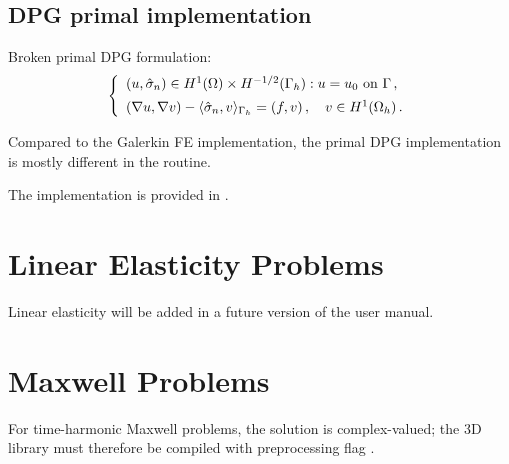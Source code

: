 \subsection{DPG primal implementation}
\label{subsec:poisson-ultraweak}

Broken primal DPG formulation:
\[
\left\{
\begin{array}{llll}
	(u, \hat \sigma_n) \in H^1(\Omega) \times H^{-1/2}(\Gamma_h): u = u_0 \text{ on } \Gamma \, , \\[5pt]
	(\nabla u, \nabla v) - \langle \hat \sigma_n , v \rangle_{\Gamma_h} 
	= (f,v) \, ,\quad v \in H^1(\Omega_h) \, .
\end{array}
\right.
\]

Compared to the Galerkin FE implementation, the primal DPG implementation is mostly different in the  routine.

The implementation is provided in .

\section{Linear Elasticity Problems}
\label{sec:elasticity}


Linear elasticity will be added in a future version of the user manual.

\section{Maxwell Problems}
\label{sec:maxwell}

For time-harmonic Maxwell problems, the solution is complex-valued; the \hp3D library must therefore be compiled with preprocessing flag .

